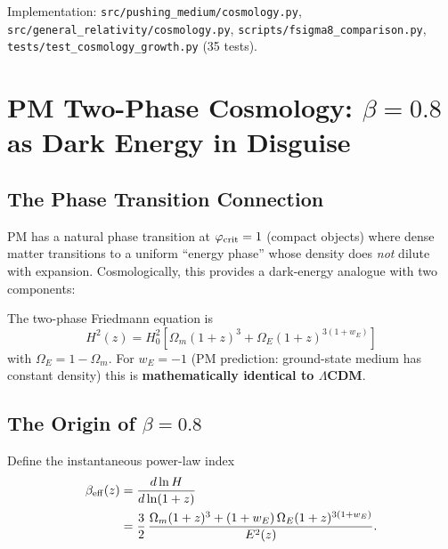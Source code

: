 \documentclass[10pt,twocolumn]{article}
\begin{document}
Implementation:
\texttt{src/pushing\_medium/cosmology.py},
\texttt{src/general\_relativity/cosmology.py},
\texttt{scripts/fsigma8\_comparison.py},
\texttt{tests/test\_cosmology\_growth.py} (35 tests).

\section{PM Two-Phase Cosmology: $\beta=0.8$ as Dark Energy in Disguise}

\subsection*{The Phase Transition Connection}

PM has a natural phase transition at $\varphi_{\rm crit}=1$ (compact objects)
where dense matter transitions to a uniform ``energy phase'' whose density
does \emph{not} dilute with expansion.  Cosmologically, this provides a
dark-energy analogue with two components:

\begin{center}
\end{center}

The two-phase Friedmann equation is
\[
  H^2(z) = H_0^2\!\left[\Omega_m(1+z)^3
            + \Omega_E(1+z)^{3(1+w_E)}\right]
\]
with $\Omega_E = 1-\Omega_m$.
For $w_E=-1$ (PM prediction: ground-state medium has constant density)
this is \textbf{mathematically identical to $\Lambda$CDM}.

\subsection*{The Origin of $\beta=0.8$}

Define the instantaneous power-law index
\begin{align*}
  \beta_{\rm eff}(z) &= \frac{d\ln H}{d\ln(1+z)} \\
  &= \frac{3}{2}\,\frac{\Omega_m(1+z)^3
    + (1+w_E)\,\Omega_E(1+z)^{3(1+w_E)}}{E^2(z)}.
\end{align*}
\end{document}
